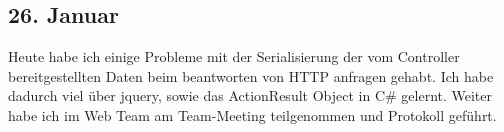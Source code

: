 \subsection{26. Januar}
Heute habe ich einige Probleme mit der Serialisierung der vom Controller bereitgestellten Daten beim beantworten von HTTP anfragen gehabt. Ich habe dadurch viel über jquery, sowie das ActionResult Object in C\# gelernt. Weiter habe ich im Web Team am Team-Meeting teilgenommen und Protokoll geführt.